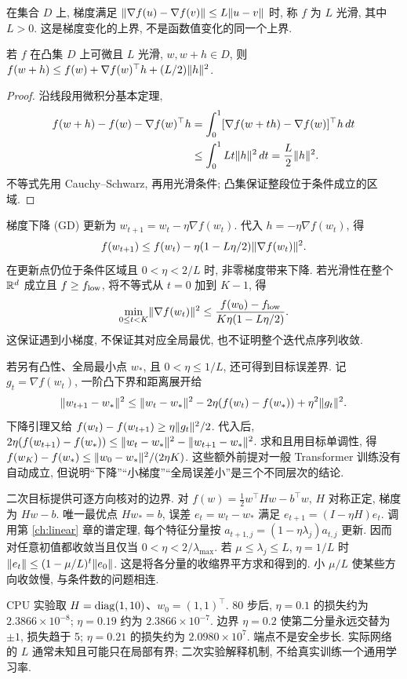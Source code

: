 \begin{definition}
在集合 $D$ 上, 梯度满足 $\lVert \nabla f(u)-\nabla f(v)\rVert\le L\lVert u-v\rVert$ 时, 称 $f$ 为 $L$ 光滑, 其中 $L>0$. 这是梯度变化的上界, 不是函数值变化的同一个上界.
\end{definition}
\begin{lemma}[下降引理]\label{lem:descent}
若 $f$ 在凸集 $D$ 上可微且 $L$ 光滑, $w,w+h\in D$, 则
$f(w+h)\le f(w)+\nabla f(w)^\top h+(L/2)\lVert h\rVert^2$.
\end{lemma}
\begin{proof}
沿线段用微积分基本定理,
\begin{align*}
f(w+h)-f(w)-\nabla f(w)^\top h
&=\int_0^1[\nabla f(w+th)-\nabla f(w)]^\top h\,dt\\
&\le\int_0^1 Lt\lVert h\rVert^2\,dt=\frac L2\lVert h\rVert^2.
\end{align*}
不等式先用 Cauchy--Schwarz, 再用光滑条件; 凸集保证整段位于条件成立的区域.
\end{proof}
梯度下降 (GD) 更新为 $w_{t+1}=w_t-\eta\nabla f(w_t)$. 代入 $h=-\eta\nabla f(w_t)$, 得
\[
f(w_{t+1})\le f(w_t)-\eta(1-L\eta/2)\lVert \nabla f(w_t)\rVert^2.
\]
在更新点仍位于条件区域且 $0<\eta<2/L$ 时, 非零梯度带来下降. 若光滑性在整个 $\mathbb R^d$ 成立且 $f\ge f_{\rm low}$, 将不等式从 $t=0$ 加到 $K-1$, 得
\[
\min_{0\le t<K}\lVert \nabla f(w_t)\rVert^2
\le\frac{f(w_0)-f_{\rm low}}{K\eta(1-L\eta/2)}.
\]
这保证遇到小梯度, 不保证其对应全局最优, 也不证明整个迭代点序列收敛.

若另有凸性、全局最小点 $w_*$, 且 $0<\eta\le1/L$, 还可得到目标误差界. 记 $g_t=\nabla f(w_t)$, 一阶凸下界和距离展开给
\[
\lVert w_{t+1}-w_*\rVert^2
\le\lVert w_t-w_*\rVert^2-2\eta(f(w_t)-f(w_*))+\eta^2\lVert g_t\rVert^2.
\]
下降引理又给 $f(w_t)-f(w_{t+1})\ge\eta\lVert g_t\rVert^2/2$. 代入后,
$2\eta(f(w_{t+1})-f(w_*))\le\lVert w_t-w_*\rVert^2-\lVert w_{t+1}-w_*\rVert^2$.
求和且用目标单调性, 得
$f(w_K)-f(w_*)\le\lVert w_0-w_*\rVert^2/(2\eta K)$.
这些额外前提对一般 Transformer 训练没有自动成立, 但说明“下降”“小梯度”“全局误差小”是三个不同层次的结论.

二次目标提供可逐方向核对的边界. 对 $f(w)=\tfrac12w^\top Hw-b^\top w$, $H$ 对称正定, 梯度为 $Hw-b$. 唯一最优点 $Hw_*=b$, 误差 $e_t=w_t-w_*$ 满足 $e_{t+1}=(I-\eta H)e_t$. 调用第 \ref{ch:linear} 章的谱定理, 每个特征分量按 $a_{t+1,j}=(1-\eta\lambda_j)a_{t,j}$ 更新. 因而对任意初值都收敛当且仅当 $0<\eta<2/\lambda_{\max}$. 若 $\mu\le\lambda_j\le L$, $\eta=1/L$ 时
$\lVert e_t\rVert\le(1-\mu/L)^t\lVert e_0\rVert$.
这是将各分量的收缩界平方求和得到的. 小 $\mu/L$ 使某些方向收敛慢, 与条件数的问题相连.

CPU 实验取 $H=\operatorname{diag}(1,10)$、$w_0=(1,1)^\top$. 80 步后, $\eta=0.1$ 的损失约为 $2.3866\times10^{-8}$; $\eta=0.19$ 约为 $2.3866\times10^{-7}$. 边界 $\eta=0.2$ 使第二分量永远交替为 $\pm1$, 损失趋于 5; $\eta=0.21$ 的损失约为 $2.0980\times10^7$. 端点不是安全步长. 实际网络的 $L$ 通常未知且可能只在局部有界; 二次实验解释机制, 不给真实训练一个通用学习率.

